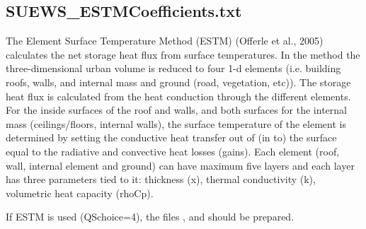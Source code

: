 \documentclass[letterpaper,10pt,english]{sphinxmanual}
\begin{document}
\subsection{SUEWS\_ESTMCoefficients.txt}
\label{\detokenize{input_files/ESTM_related_files/ESTM_related_files:suews-estmcoefficients-txt}}\label{\detokenize{input_files/ESTM_related_files/ESTM_related_files:id1}}

The Element Surface Temperature Method (ESTM) (Offerle et al., 2005)
calculates the net storage heat flux from surface temperatures. In the
method the three-dimensional urban volume is reduced to four 1-d
elements (i.e. building roofs, walls, and internal mass and ground
(road, vegetation, etc)). The storage heat flux is calculated from the
heat conduction through the different elements. For the inside surfaces
of the roof and walls, and both surfaces for the internal mass
(ceilings/floors, internal walls), the surface temperature of the
element is determined by setting the conductive heat transfer out of (in
to) the surface equal to the radiative and convective heat losses
(gains). Each element (roof, wall, internal element and ground) can have
maximum five layers and each layer has three parameters tied to it:
thickness (x), thermal conductivity (k), volumetric heat capacity
(rhoCp).

If ESTM is used (QSchoice=4), the files
{\hyperref[\detokenize{input_files/ESTM_related_files/ESTM_related_files:suews-estmcoefficients-txt}]{}},
 and
{\hyperref[\detokenize{input_files/ESTM_related_files/ESTM_related_files:ssss-yyyy-estm-ts-data-tt-txt}]{}} should be
prepared.
\end{document}
